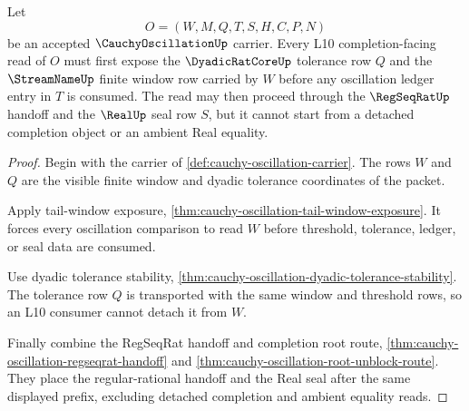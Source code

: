 \begin{theorem}
\label{thm:cauchy-oscillation-l10-window-admission}
Let
$$
O=(W,M,Q,T,S,H,C,P,N)
$$
be an accepted $\CauchyOscillationUp$ carrier. Every L10 completion-facing read of $O$ must first expose the $\DyadicRatCoreUp$ tolerance row $Q$ and the $\StreamNameUp$ finite window row carried by $W$ before any oscillation ledger entry in $T$ is consumed. The read may then proceed through the $\RegSeqRatUp$ handoff and the $\RealUp$ seal row $S$, but it cannot start from a detached completion object or an ambient Real equality.
\end{theorem}
\begin{proof}
Begin with the carrier of \autoref{def:cauchy-oscillation-carrier}. The rows $W$ and $Q$ are the visible finite window and dyadic tolerance coordinates of the packet.

Apply tail-window exposure, \autoref{thm:cauchy-oscillation-tail-window-exposure}. It forces every oscillation comparison to read $W$ before threshold, tolerance, ledger, or seal data are consumed.

Use dyadic tolerance stability, \autoref{thm:cauchy-oscillation-dyadic-tolerance-stability}. The tolerance row $Q$ is transported with the same window and threshold rows, so an L10 consumer cannot detach it from $W$.

Finally combine the RegSeqRat handoff and completion root route, \autoref{thm:cauchy-oscillation-regseqrat-handoff} and \autoref{thm:cauchy-oscillation-root-unblock-route}. They place the regular-rational handoff and the Real seal after the same displayed prefix, excluding detached completion and ambient equality reads.
\end{proof}

